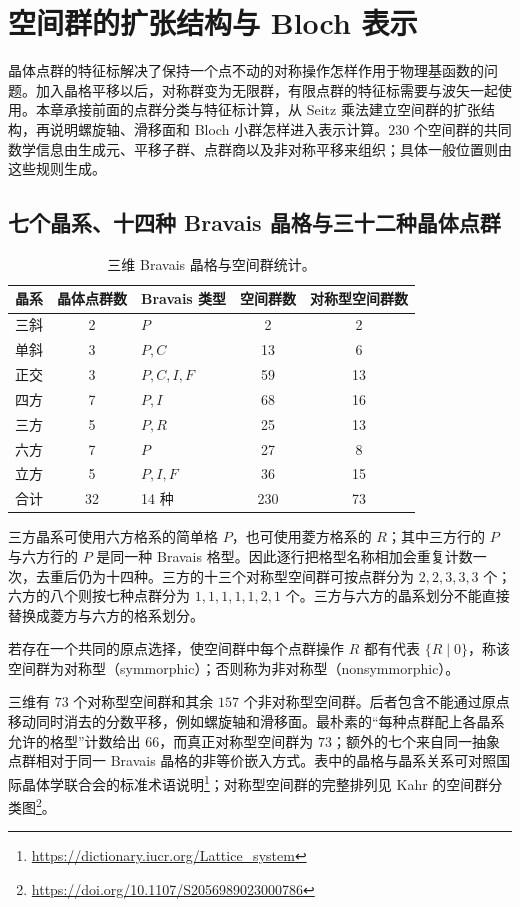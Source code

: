 \chapter{空间群的扩张结构与 Bloch 表示}
\label{app:space-group-reference}

晶体点群的特征标解决了保持一个点不动的对称操作怎样作用于物理基函数的问题。加入晶格平移以后，对称群变为无限群，有限点群的特征标需要与波矢一起使用。本章承接前面的点群分类与特征标计算，从 Seitz 乘法建立空间群的扩张结构，再说明螺旋轴、滑移面和 Bloch 小群怎样进入表示计算。$230$ 个空间群的共同数学信息由生成元、平移子群、点群商以及非对称平移来组织；具体一般位置则由这些规则生成。

\section{七个晶系、十四种 Bravais 晶格与三十二种晶体点群}

\begin{table}[htbp]
\centering
\caption{三维 Bravais 晶格与空间群统计。}
\label{tab:bravais-space-counts}
\begin{tabular}{cclcc}
\toprule
晶系 & 晶体点群数 & Bravais 类型 & 空间群数 & 对称型空间群数\\
\midrule
三斜 &2& $P$ &2&2\\
单斜 &3& $P,C$ &13&6\\
正交 &3& $P,C,I,F$ &59&13\\
四方 &7& $P,I$ &68&16\\
三方 &5& $P,R$ &25&13\\
六方 &7& $P$ &27&8\\
立方 &5& $P,I,F$ &36&15\\
\midrule
合计 &32&14 种 &230&73\\
\bottomrule
\end{tabular}
\end{table}

\begin{note}[晶系与格系的计数]
三方晶系可使用六方格系的简单格 $P$，也可使用菱方格系的 $R$；其中三方行的 $P$ 与六方行的 $P$ 是同一种 Bravais 格型。因此逐行把格型名称相加会重复计数一次，去重后仍为十四种。三方的十三个对称型空间群可按点群分为 $2,2,3,3,3$ 个；六方的八个则按七种点群分为 $1,1,1,1,1,2,1$ 个。三方与六方的晶系划分不能直接替换成菱方与六方的格系划分。
\end{note}

\begin{definition}[对称型与非对称型空间群]
若存在一个共同的原点选择，使空间群中每个点群操作 $R$ 都有代表 $\{R\mid0\}$，称该空间群为对称型（symmorphic）；否则称为非对称型（nonsymmorphic）。
\end{definition}
三维有 $73$ 个对称型空间群和其余 $157$ 个非对称型空间群。后者包含不能通过原点移动同时消去的分数平移，例如螺旋轴和滑移面。最朴素的“每种点群配上各晶系允许的格型”计数给出 $66$，而真正对称型空间群为 $73$；额外的七个来自同一抽象点群相对于同一 Bravais 晶格的非等价嵌入方式。表中的晶格与晶系关系可对照国际晶体学联合会的标准术语说明\footnote{\url{https://dictionary.iucr.org/Lattice_system}}；对称型空间群的完整排列见 Kahr 的空间群分类图\footnote{\url{https://doi.org/10.1107/S2056989023000786}}。

